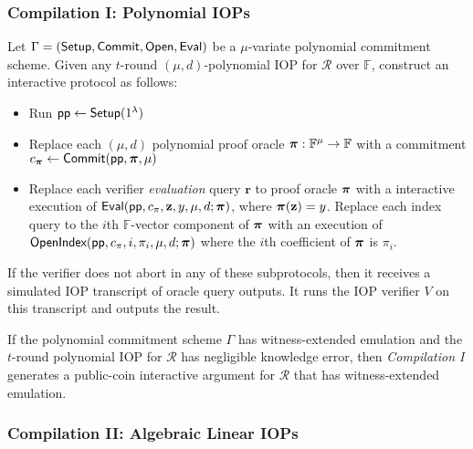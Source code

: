 \subsubsection*{Compilation I: Polynomial IOPs} 
Let $\Gamma = (\textsf{{Setup}}, \textsf{{Commit}}, \textsf{{Open}}, \textsf{{Eval}})$ be a $\mu$-variate polynomial commitment scheme. Given any $t$-round $(\mu, d)$-polynomial IOP for $\mathcal{R}$ over $\mathbb{F}$, construct an interactive protocol as follows: 
\begin{itemize}
\item Run $\textsf{pp} \leftarrow \textsf{{Setup}}(1^\lambda)$
\item Replace each $(\mu, d)$ polynomial proof oracle $\boldsymbol{\pi}: \mathbb{F}^\mu \rightarrow \mathbb{F}$ with a commitment $c_{\boldsymbol{\pi}} \leftarrow \textsf{{Commit}}(\textsf{pp}, \boldsymbol{\pi}, \mu)$
\item Replace each verifier \emph{evaluation} query $\mathbf{r}$ to proof oracle $\boldsymbol{\pi}$ with a interactive execution of $\textsf{{Eval}}(\textsf{pp}, c_\pi, \mathbf{z}, y, \mu, d; \boldsymbol{\pi})$, where $\boldsymbol{\pi}(\mathbf{z}) = y$. Replace each index query to the $i$th $\mathbb{F}$-vector component of $\boldsymbol{\pi}$ with an execution of $\textsf{{OpenIndex}}(\textsf{pp}, c_\pi, i, \pi_i, \mu, d; \boldsymbol{\pi})$ where the $i$th coefficient of $\boldsymbol{\pi}$ is $\pi_i$. 
\end{itemize}

If the verifier does not abort in any of these subprotocols, then it receives a simulated IOP transcript of oracle query outputs. It runs the IOP verifier $V$ on this transcript and outputs the result. 


\begin{lemma}
If the polynomial commitment scheme $\Gamma$ has witness-extended emulation and the $t$-round polynomial IOP for $\mathcal{R}$ has negligible knowledge error, then \emph{Compilation I} generates a public-coin interactive argument for $\mathcal{R}$ that has witness-extended emulation. 
\end{lemma}

\subsubsection*{Compilation II: Algebraic Linear IOPs} 

